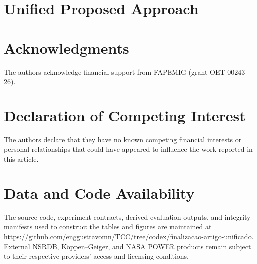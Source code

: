\documentclass[final,5p,times,twocolumn]{elsarticle}
\begin{document}




\section{Unified Proposed Approach}
\label{sec:proposed_approach}









\section*{Acknowledgments}
The authors acknowledge financial support from FAPEMIG (grant OET-00243-26).

\section*{Declaration of Competing Interest}
The authors declare that they have no known competing financial interests or
personal relationships that could have appeared to influence the work
reported in this article.

\section*{Data and Code Availability}
The source code, experiment contracts, derived evaluation outputs, and
integrity manifests used to construct the tables and figures are maintained at
\url{https://github.com/enggusttavomn/TCC/tree/codex/finalizacao-artigo-unificado}.
External NSRDB, K\"oppen--Geiger, and NASA POWER products remain subject to
their respective providers' access and licensing conditions.

\appendix




\end{document}
